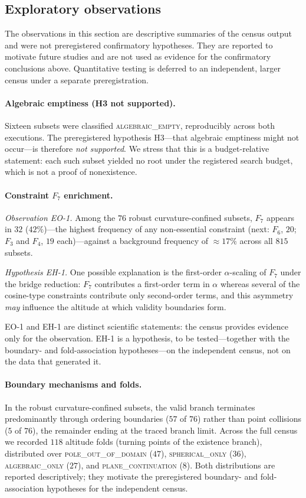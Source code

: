 \documentclass[11pt]{article}
\begin{document}
\subsection{Exploratory observations}
\label{sec:exploratory}

The observations in this section are descriptive summaries of the census output and were not preregistered confirmatory hypotheses. They are reported to motivate future studies and are not used as evidence for the confirmatory conclusions above. Quantitative testing is deferred to an independent, larger census under a separate preregistration.

\paragraph{Algebraic emptiness (H3 not supported).}
Sixteen subsets were classified \textsc{algebraic\_empty}, reproducibly across both executions. The preregistered hypothesis H3---that algebraic emptiness might not occur---is therefore \emph{not supported}. We stress that this is a budget-relative statement: each such subset yielded no root under the registered search budget, which is not a proof of nonexistence.

\paragraph{Constraint $F_7$ enrichment.}
\emph{Observation EO-1.} Among the $76$ robust curvature-confined subsets, $F_7$ appears in $32$ ($42\%$)---the highest frequency of any non-essential constraint (next: $F_6$, $20$; $F_3$ and $F_4$, $19$ each)---against a background frequency of $\approx 17\%$ across all $815$ subsets.

\emph{Hypothesis EH-1.} One possible explanation is the first-order $\alpha$-scaling of $F_7$ under the bridge reduction: $F_7$ contributes a
first-order term in $\alpha$ whereas several of the cosine-type constraints
contribute only second-order terms, and this asymmetry \emph{may} influence the altitude at which validity boundaries form.

EO-1 and EH-1 are distinct scientific statements: the census provides evidence only for the observation. EH-1 is a hypothesis, to be tested---together with the boundary- and fold-association hypotheses---on the independent census, not on the data that generated it.

\paragraph{Boundary mechanisms and folds.}
In the robust curvature-confined subsets, the valid branch terminates predominantly through ordering boundaries ($57$ of $76$) rather than point collisions ($5$ of $76$), the remainder ending at the traced branch limit. Across the full census we recorded $118$ altitude folds (turning points of the existence branch), distributed over \textsc{pole\_out\_of\_domain} ($47$), \textsc{spherical\_only} ($36$), \textsc{algebraic\_only} ($27$), and \textsc{plane\_continuation} ($8$). Both distributions are reported descriptively; they motivate the preregistered boundary- and fold-association hypotheses for the independent census.
\end{document}
